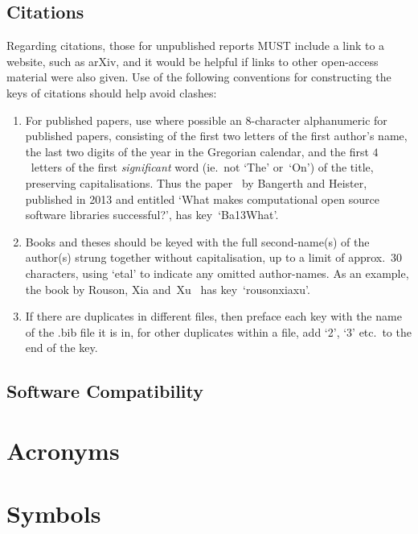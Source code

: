 \subsection{Citations}\label{sec:REF_citations}
Regarding citations, those for unpublished reports MUST include a link to a
website, such as arXiv, and it would be helpful if links to other open-access
material were also given.
Use of the following conventions for constructing the keys of citations should help avoid clashes:
\begin{enumerate}
\item For published papers, use where possible an $8$-character alphanumeric for published papers,
consisting of the first two letters of the first author's name, the last two digits
of the year in the Gregorian calendar, and the first $4$~letters of the first \emph{significant}
word (ie.\ not `The' or~`On') of the title, preserving capitalisations.
Thus the paper~\cite{Ba13What} by Bangerth and Heister, published in 2013 and
entitled `What makes computational open source software libraries successful?',
has key~`Ba13What'.
\item Books and theses should be keyed with the full second-name(s) of the author(s) strung together
without capitalisation, up to a limit of approx.~$30$ characters, using `etal'
to indicate any omitted author-names. As an example, the book by Rouson, Xia
and~Xu~\cite{rousonxiaxu} has key~`rousonxiaxu'.
\item If there are duplicates in different files, then preface
each key with the name of the .bib file it is in, for other duplicates within a file,
add `2', `3' etc.\ to the end of the key.
\end{enumerate}

\subsection{Software Compatibility}\label{sec:REF_compat}


\clearpage
\section{Acronyms}\label{sec:acro}


\clearpage
\section{Symbols}\label{sec:symbol}

